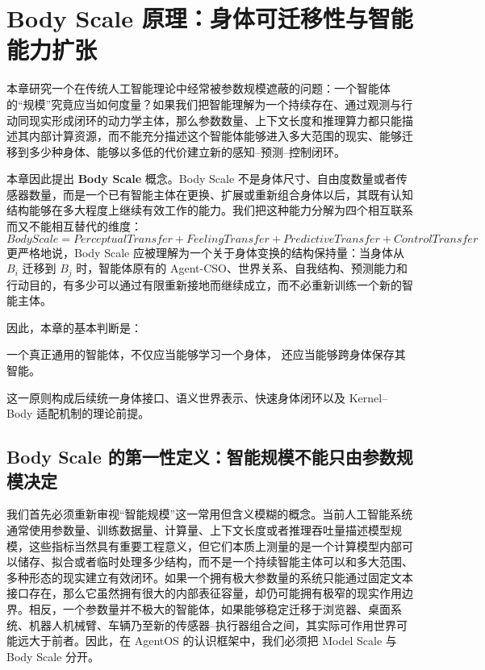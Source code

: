 \chapter{Body Scale 原理：身体可迁移性与智能能力扩张}

\begin{chapterlead}
本章研究一个在传统人工智能理论中经常被参数规模遮蔽的问题：一个智能体的“规模”究竟应当如何度量？如果我们把智能理解为一个持续存在、通过观测与行动同现实形成闭环的动力学主体，那么参数数量、上下文长度和推理算力都只能描述其内部计算资源，而不能充分描述这个智能体能够进入多大范围的现实、能够迁移到多少种身体、能够以多低的代价建立新的感知--预测--控制闭环。

本章因此提出 \textbf{Body Scale} 概念。Body Scale 不是身体尺寸、自由度数量或者传感器数量，而是一个已有智能主体在更换、扩展或重新组合身体以后，其既有认知结构能够在多大程度上继续有效工作的能力。我们把这种能力分解为四个相互联系而又不能相互替代的维度：
\[
\boxed{
BodyScale
=
PerceptualTransfer
+
FeelingTransfer
+
PredictiveTransfer
+
ControlTransfer
}
\]
更严格地说，Body Scale 应被理解为一个关于身体变换的结构保持量：当身体从 $B_i$ 迁移到 $B_j$ 时，智能体原有的 Agent-CSO、世界关系、自我结构、预测能力和行动目的，有多少可以通过有限重新接地而继续成立，而不必重新训练一个新的智能主体。

因此，本章的基本判断是：
\begin{statementbox}
一个真正通用的智能体，不仅应当能够学习一个身体，
还应当能够跨身体保存其智能。
\end{statementbox}
这一原则构成后续统一身体接口、语义世界表示、快速身体闭环以及 Kernel--Body 适配机制的理论前提。
\end{chapterlead}


\section{Body Scale 的第一性定义：智能规模不能只由参数规模决定}

我们首先必须重新审视“智能规模”这一常用但含义模糊的概念。当前人工智能系统通常使用参数量、训练数据量、计算量、上下文长度或者推理吞吐量描述模型规模，这些指标当然具有重要工程意义，但它们本质上测量的是一个计算模型内部可以储存、拟合或者临时处理多少结构，而不是一个持续智能主体可以和多大范围、多种形态的现实建立有效闭环。如果一个拥有极大参数量的系统只能通过固定文本接口存在，那么它虽然拥有很大的内部表征容量，却仍可能拥有极窄的现实作用边界。相反，一个参数量并不极大的智能体，如果能够稳定迁移于浏览器、桌面系统、机器人机械臂、车辆乃至新的传感器--执行器组合之间，其实际可作用世界可能远大于前者。因此，在 AgentOS 的认识框架中，我们必须把 Model Scale 与 Body Scale 分开。

